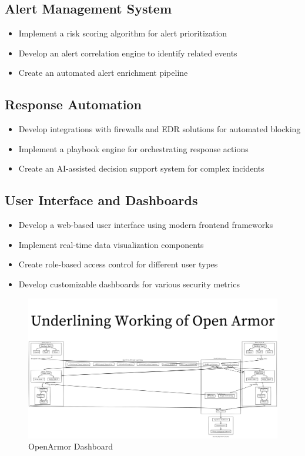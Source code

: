 \subsection{Alert Management System}
\begin{itemize}
    \item Implement a risk scoring algorithm for alert prioritization
    \item Develop an alert correlation engine to identify related events
    \item Create an automated alert enrichment pipeline
\end{itemize}

\subsection{Response Automation}
\begin{itemize}
    \item Develop integrations with firewalls and EDR solutions for automated blocking
    \item Implement a playbook engine for orchestrating response actions
    \item Create an AI-assisted decision support system for complex incidents
\end{itemize}

\subsection{User Interface and Dashboards}
\begin{itemize}
    \item Develop a web-based user interface using modern frontend frameworks
    \item Implement real-time data visualization components
    \item Create role-based access control for different user types
    \item Develop customizable dashboards for various security metrics
\end{itemize}

\begin{figure}[h]
    \centering
    \includegraphics[width=1\linewidth]{working.png}
    \caption{OpenArmor Dashboard}
    \label{fig:openarmor-dashboard}
\end{figure}

